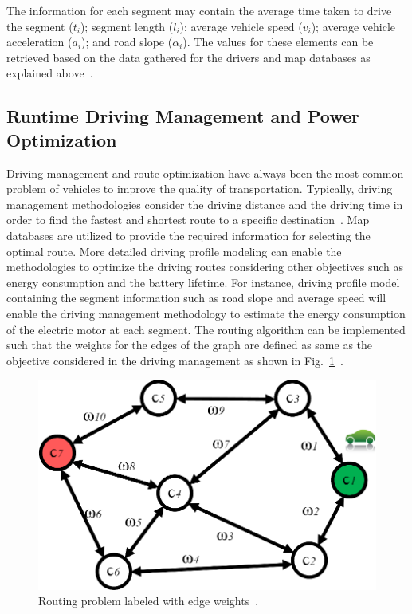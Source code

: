 The information for each segment may contain the average time taken to drive the segment ($t_i$); segment length ($l_i$); average vehicle speed ($v_i$); average vehicle acceleration ($a_i$); and road slope ($\alpha_i$).
The values for these elements can be retrieved based on the data gathered for the drivers and map databases as explained above~\cite{AF_1,AF_11}.


\subsection{Runtime Driving Management and Power Optimization}

Driving management and route optimization have always been the most common problem of vehicles to improve the quality of transportation. Typically, driving management methodologies consider the driving distance and the driving time in order to find the fastest and shortest route to a specific destination~\cite{AF_37,AF_38,AF_39}. Map databases are utilized to provide the required information for selecting the optimal route. More detailed driving profile modeling can enable the methodologies to optimize the driving routes considering other objectives such as energy consumption and the battery lifetime. For instance, driving profile model containing the segment information such as road slope and average speed will enable the driving management methodology to estimate the energy consumption of the electric motor at each segment. The routing algorithm can be implemented such that the weights for the edges of the graph are defined as same as the objective considered in the driving management as shown in Fig.~\ref{AF_image3}~\cite{AF_40,AF_41,AF_42}. 

\begin{figure}
\centering
\includegraphics[width=0.8\hsize]{Figures/Al_Faruque/AF_figure3.png}
\caption{Routing problem labeled with edge weights~\cite{AF_11}.}
\label{AF_image3}
\end{figure}      

